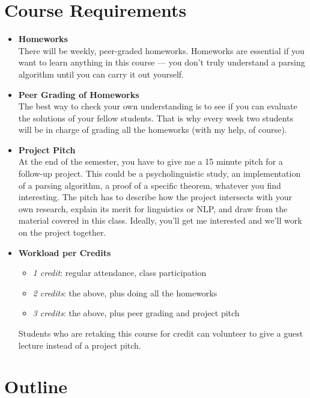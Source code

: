 \section{Course Requirements}
\begin{itemize}
    \item \textbf{Homeworks}\\
        There will be weekly, peer-graded homeworks.
        Homeworks are essential if you want to learn anything in this course --- you don't truly understand a parsing algorithm until you can carry it out yourself.
    \item \textbf{Peer Grading of Homeworks}\\
        The best way to check your own understanding is to see if you can evaluate the solutions of your fellow students.
        That is why every week two students will be in charge of grading all the homeworks (with my help, of course).
    \item \textbf{Project Pitch}\\
        At the end of the semester, you have to give me a 15 minute pitch for a follow-up project.
        This could be a psycholinguistic study, an implementation of a parsing algorithm, a proof of a specific theorem, whatever you find interesting.
        The pitch has to describe how the project intersects with your own research, explain its merit for linguistics or NLP, and draw from the material covered in this class.
        Ideally, you'll get me interested and we'll work on the project together.
    \item \textbf{Workload per Credits}
        \begin{itemize}
            \item \emph{1 credit}: regular attendance, class participation
            \item \emph{2 credits}: the above, plus doing all the homeworks 
            \item \emph{3 credits}: the above, plus peer grading and project pitch
        \end{itemize}
        Students who are retaking this course for credit can volunteer to give a guest lecture instead of a project pitch.
\end{itemize}


\section{Outline}

